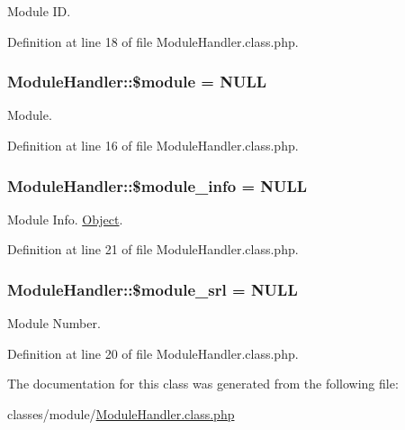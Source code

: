 Module ID. 



Definition at line 18 of file Module\+Handler.\+class.\+php.

\subsubsection[{\texorpdfstring{\$module}{$module}}]{\setlength{\rightskip}{0pt plus 5cm}Module\+Handler\+::\$module = N\+U\+LL}\hypertarget{classModuleHandler_a24f28ac6c101582f043bef672a9f3b00}{}\label{classModuleHandler_a24f28ac6c101582f043bef672a9f3b00}


Module. 



Definition at line 16 of file Module\+Handler.\+class.\+php.

\subsubsection[{\texorpdfstring{\$module\+\_\+info}{$module_info}}]{\setlength{\rightskip}{0pt plus 5cm}Module\+Handler\+::\$module\+\_\+info = N\+U\+LL}\hypertarget{classModuleHandler_a2388e5ef665a5a82efa00c8c894df33c}{}\label{classModuleHandler_a2388e5ef665a5a82efa00c8c894df33c}


Module Info. \hyperlink{classObject}{Object}. 



Definition at line 21 of file Module\+Handler.\+class.\+php.

\subsubsection[{\texorpdfstring{\$module\+\_\+srl}{$module_srl}}]{\setlength{\rightskip}{0pt plus 5cm}Module\+Handler\+::\$module\+\_\+srl = N\+U\+LL}\hypertarget{classModuleHandler_ad79751537e64d7bfc7dc6fa4280043b0}{}\label{classModuleHandler_ad79751537e64d7bfc7dc6fa4280043b0}


Module Number. 



Definition at line 20 of file Module\+Handler.\+class.\+php.



The documentation for this class was generated from the following file\+:\begin{DoxyCompactItemize}
\item 
classes/module/\hyperlink{ModuleHandler_8class_8php}{Module\+Handler.\+class.\+php}\end{DoxyCompactItemize}
